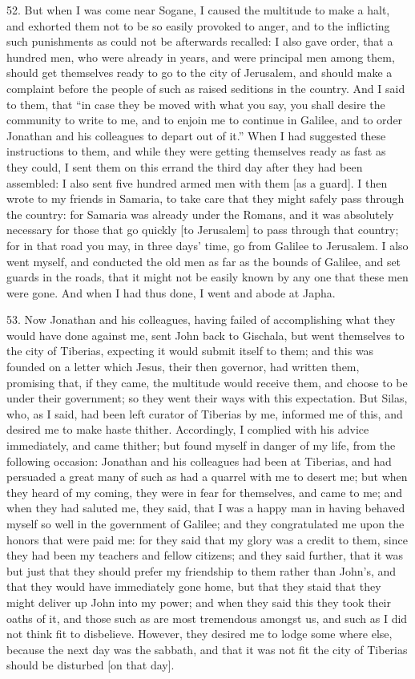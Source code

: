 52. But when I was come near Sogane, I caused the multitude to make a
halt, and exhorted them not to be so easily provoked to anger, and to the
inflicting such punishments as could not be afterwards recalled: I also
gave order, that a hundred men, who were already in years, and were
principal men among them, should get themselves ready to go to the city of
Jerusalem, and should make a complaint before the people of such as raised
seditions in the country. And I said to them, that ``in case they be moved
with what you say, you shall desire the community to write to me, and to
enjoin me to continue in Galilee, and to order Jonathan and his colleagues
to depart out of it.'' When I had suggested these instructions to them, and
while they were getting themselves ready as fast as they could, I sent
them on this errand the third day after they had been assembled: I also
sent five hundred armed men with them [as a guard]. I then wrote to my
friends in Samaria, to take care that they might safely pass through the
country: for Samaria was already under the Romans, and it was absolutely
necessary for those that go quickly [to Jerusalem] to pass through that
country; for in that road you may, in three days' time, go from Galilee to
Jerusalem. I also went myself, and conducted the old men as far as the
bounds of Galilee, and set guards in the roads, that it might not be
easily known by any one that these men were gone. And when I had thus
done, I went and abode at Japha.

53. Now Jonathan and his colleagues, having failed of accomplishing what
they would have done against me, sent John back to Gischala, but went
themselves to the city of Tiberias, expecting it would submit itself to
them; and this was founded on a letter which Jesus, their then governor,
had written them, promising that, if they came, the multitude would
receive them, and choose to be under their government; so they went their
ways with this expectation. But Silas, who, as I said, had been left
curator of Tiberias by me, informed me of this, and desired me to make
haste thither. Accordingly, I complied with his advice immediately, and
came thither; but found myself in danger of my life, from the following
occasion: Jonathan and his colleagues had been at Tiberias, and had
persuaded a great many of such as had a quarrel with me to desert me; but
when they heard of my coming, they were in fear for themselves, and came
to me; and when they had saluted me, they said, that I was a happy man in
having behaved myself so well in the government of Galilee; and they
congratulated me upon the honors that were paid me: for they said that my
glory was a credit to them, since they had been my teachers and fellow
citizens; and they said further, that it was but just that they should
prefer my friendship to them rather than John's, and that they would have
immediately gone home, but that they staid that they might deliver up John
into my power; and when they said this they took their oaths of it, and
those such as are most tremendous amongst us, and such as I did not think
fit to disbelieve. However, they desired me to lodge some where else,
because the next day was the sabbath, and that it was not fit the city of
Tiberias should be disturbed [on that day].

